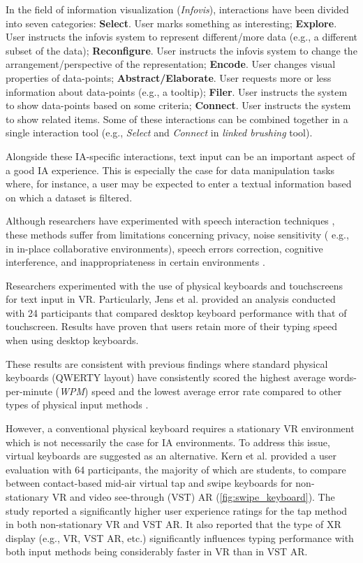 \documentclass{vgtc}                          %
\begin{document}
\noindent In the field of information visualization (\textit{Infovis}), interactions have been divided into seven
categories: \textbf{Select}. User marks something as interesting; \textbf{Explore}. User instructs the
infovis system to represent different/more data (e.g., a different subset of the data);
\textbf{Reconfigure}. User instructs the infovis system to change the arrangement/perspective of the
representation; \textbf{Encode}. User changes visual properties of data-points; \textbf{Abstract/Elaborate}.
User requests more or less information about data-points (e.g., a tooltip); \textbf{Filer}. User instructs the
system to show data-points based on some criteria; \textbf{Connect}. User instructs the system to show related
items. Some of these interactions can be combined together in a single interaction tool (e.g., \textit{Select}
and \textit{Connect} in \textit{linked brushing} tool).

\smallskip

\noindent Alongside these IA-specific interactions, text input can be an important aspect of a good IA
experience. This is especially the case for data manipulation tasks where, for instance, a user may be
expected to enter a textual information based on which a dataset is filtered.

\noindent Although researchers have experimented with speech interaction techniques
\cite{wizualization_toolkit}, these methods suffer from limitations concerning privacy, noise sensitivity (
e.g., in in-place collaborative environments), speech errors correction, cognitive interference, and
inappropriateness in certain environments \cite{limits_of_speech_recognition}.

\noindent Researchers experimented with the use of physical keyboards and touchscreens for text input
in VR. Particularly, Jens et al. \cite{keyboard_vs_touchscreen} provided an analysis conducted with 24
participants that compared desktop keyboard performance with that of touchscreen. Results have proven that
users retain more of their typing speed when using desktop keyboards.

These results are consistent with previous findings where standard physical keyboards
(QWERTY layout) have consistently scored the highest average words-per-minute (\textit{WPM}) speed and the
lowest average error rate compared to other types of physical input methods \cite{physical_text_entry_comparison}.

\noindent However, a conventional physical keyboard requires a stationary VR environment which is not necessarily the
case for IA environments. To address this issue, virtual keyboards are suggested as an alternative. Kern et
al. \cite{tap_vs_word_gesture_keyboards} provided a user evaluation with 64 participants, the majority of
which are students, to compare between contact-based mid-air virtual tap and swipe keyboards for
non-stationary VR and video see-through (VST) AR (\autoref{fig:swipe_keyboard}). The study reported a
significantly higher user experience ratings for the tap method in both non-stationary VR and VST AR. It also
reported that the type of XR display (e.g., VR, VST AR, etc.) significantly influences typing performance
with both input methods being considerably faster in VR than in VST AR.
\end{document}
